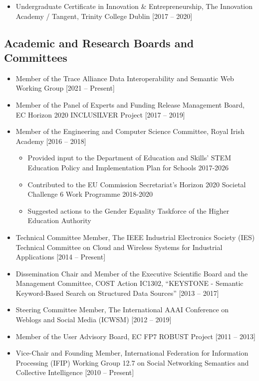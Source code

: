 \documentclass[10pt,a4paper]{res} %
\begin{document}
\begin{resume}
\begin{itemize} \itemsep -2pt
\item Undergraduate Certificate in Innovation \& Entrepreneurship, The Innovation Academy / Tangent, Trinity College Dublin [2017 -- 2020]
\end{itemize}

\subsection*{Academic and Research Boards and Committees}
\begin{itemize} \itemsep -2pt
\item Member of the Trace Alliance Data Interoperability and Semantic Web Working Group [2021 -- Present]
\item Member of the Panel of Experts and Funding Release Management Board, EC Horizon 2020 INCLUSILVER Project [2017 -- 2019]
\item Member of the Engineering and Computer Science Committee, Royal Irish Academy [2016 -- 2018]
\begin{itemize} \itemsep -2pt
\item Provided input to the Department of Education and Skills' STEM Education Policy and Implementation Plan for Schools 2017-2026
\item Contributed to the EU Commission Secretariat's Horizon 2020 Societal Challenge 6 Work Programme 2018-2020
\item Suggested actions to the Gender Equality Taskforce of the Higher Education Authority
\end{itemize}
\item Technical Committee Member, The IEEE Industrial Electronics Society (IES) Technical Committee on Cloud and Wireless Systems for Industrial Applications [2014 -- Present]
\item Dissemination Chair and Member of the Executive Scientific Board and the Management Committee, COST Action IC1302, ``KEYSTONE - Semantic Keyword-Based Search on Structured Data Sources'' [2013 -- 2017]
\item Steering Committee Member, The International AAAI Conference on Weblogs and Social Media (ICWSM) [2012 -- 2019]
\item Member of the User Advisory Board, EC FP7 ROBUST Project [2011 -- 2013]
\item Vice-Chair and Founding Member, International Federation for Information Processing (IFIP) Working Group 12.7 on Social Networking Semantics and Collective Intelligence [2010 -- Present]
\end{itemize}


\end{resume}
\end{document}
